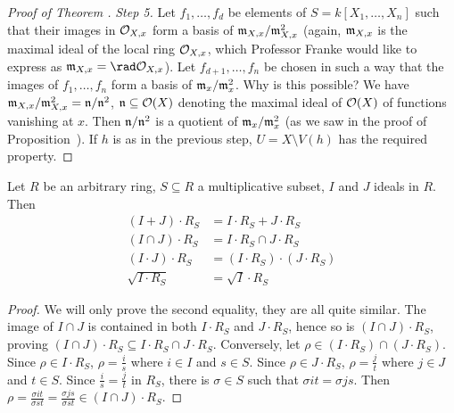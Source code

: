 \documentclass[a4paper,parskip=half,numbers=enddot, DIV=12]{scrreprt}
\begin{document}
\begin{proof}[Proof of Theorem ]
    \emph{Step 5.} Let $f_1,\ldots, f_d$ be elements of $S= k[X_1,\ldots, X_n]$ such that their images in $\mathcal{O}_{X,x}$ form a basis of $\mathfrak{m}_{X,x}/\mathfrak{m}_{X,x}^2$ (again, $\mathfrak{m}_{X,x}$ is the maximal ideal of the local ring $\mathcal{O}_{X,x}$, which Professor Franke would like to express as $\mm_{X,x}=\rad \Oo_{X,x}$). Let $f_{d+1},\ldots, f_n$ be chosen in such a way that the images of $f_1,\ldots, f_n$ form a basis of $\mathfrak{m}_x/\mathfrak{m}_x^2$. Why is this possible? We have $\mathfrak{m}_{X,x}/\mathfrak{m}_{X,x}^2=\mathfrak{n}/\mathfrak{n}^2$, $\mathfrak{n}\subseteq\mathcal{O}(X)$ denoting the maximal ideal of $\mathcal{O}(X)$ of functions vanishing at $x$. Then $\mathfrak{n}/\mathfrak{n}^2$ is a quotient of $\mathfrak{m}_x/\mathfrak{m}_x^2$ (as we saw in the proof of Proposition~). If $h$ is as in the previous step, $U= X\setminus V(h)$ has the required property.
\end{proof}
\begin{rem}
    Let $R$ be an arbitrary ring, $S\subseteq R$ a multiplicative subset, $I$ and $J$ ideals in $R$. Then 
    \begin{align*}
        (I+J) \cdot R_S &= I\cdot R_S + J \cdot R_S\\
        (I\cap J)\cdot R_S &= I\cdot R_S \cap J\cdot R_S\\
        (I\cdot J)\cdot R_S &= (I\cdot R_S)\cdot(J\cdot R_S)\\
        \sqrt{I\cdot R_S}&= \sqrt{I}\cdot R_S
    \end{align*}
\end{rem}
\begin{proof}
    We will only prove the second equality, they are all quite similar. The image of $I\cap J$ is contained in both $I\cdot R_S$ and $J\cdot R_S$, hence so is $(I\cap J)\cdot R_S$, proving $(I\cap J) \cdot R_S \subseteq I\cdot R_S \cap J\cdot R_S$. Conversely, let $\rho \in (I \cdot R_S)\cap (J\cdot R_S)$. Since $\rho\in I\cdot R_S$, $\rho = \frac{i}{s}$ where $i\in I$ and $s\in S$. Since $\rho\in J\cdot R_S$, $\rho = \frac{j}{t}$ where $j\in J$ and $t\in S$. Since $\frac{i}{s}=\frac{j}{t}$ in $R_S$, there is $\sigma \in S$ such that $\sigma i t = \sigma  j  s$. Then $\rho = \frac{\sigma  i t}{\sigma  s t} = \frac{\sigma  j s}{\sigma  s t}\in (I\cap J)\cdot R_S$.
\end{proof}
\end{document}
